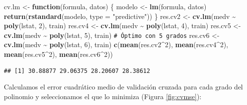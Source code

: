 \documentclass[
]{book}
\newenvironment{Shaded}{\begin{snugshade}}{\end{snugshade}}
\newcommand{\AttributeTok}[1]{\textcolor[rgb]{0.13,0.29,0.53}{#1}}
\newcommand{\CommentTok}[1]{\textcolor[rgb]{0.56,0.35,0.01}{\textit{#1}}}
\newcommand{\ControlFlowTok}[1]{\textcolor[rgb]{0.13,0.29,0.53}{\textbf{#1}}}
\newcommand{\DecValTok}[1]{\textcolor[rgb]{0.00,0.00,0.81}{#1}}
\newcommand{\FunctionTok}[1]{\textcolor[rgb]{0.13,0.29,0.53}{\textbf{#1}}}
\newcommand{\NormalTok}[1]{#1}
\newcommand{\OtherTok}[1]{\textcolor[rgb]{0.56,0.35,0.01}{#1}}
\newcommand{\SpecialCharTok}[1]{\textcolor[rgb]{0.81,0.36,0.00}{\textbf{#1}}}
\newcommand{\StringTok}[1]{\textcolor[rgb]{0.31,0.60,0.02}{#1}}
\theoremstyle{break}
\theoremstyle{nonumberplain}
\renewcommand{\CommentTok}[1]{\textcolor[rgb]{0.41,0.41,0.41}{\texttt{#1}}}
\begin{document}
\begin{Shaded}
\begin{Highlighting}[]
\NormalTok{cv.lm }\OtherTok{\textless{}{-}} \ControlFlowTok{function}\NormalTok{(formula, datos) \{}
\NormalTok{    modelo }\OtherTok{\textless{}{-}} \FunctionTok{lm}\NormalTok{(formula, datos)}
    \FunctionTok{return}\NormalTok{(}\FunctionTok{rstandard}\NormalTok{(modelo, }\AttributeTok{type =} \StringTok{"predictive"}\NormalTok{))}
\NormalTok{\}}
\NormalTok{res.cv2 }\OtherTok{\textless{}{-}} \FunctionTok{cv.lm}\NormalTok{(medv }\SpecialCharTok{\textasciitilde{}} \FunctionTok{poly}\NormalTok{(lstat, }\DecValTok{2}\NormalTok{), train)}
\NormalTok{res.cv4 }\OtherTok{\textless{}{-}} \FunctionTok{cv.lm}\NormalTok{(medv }\SpecialCharTok{\textasciitilde{}} \FunctionTok{poly}\NormalTok{(lstat, }\DecValTok{4}\NormalTok{), train)}
\NormalTok{res.cv5 }\OtherTok{\textless{}{-}} \FunctionTok{cv.lm}\NormalTok{(medv }\SpecialCharTok{\textasciitilde{}} \FunctionTok{poly}\NormalTok{(lstat, }\DecValTok{5}\NormalTok{), train) }\CommentTok{\# Óptimo con 5 grados}
\NormalTok{res.cv6 }\OtherTok{\textless{}{-}} \FunctionTok{cv.lm}\NormalTok{(medv }\SpecialCharTok{\textasciitilde{}} \FunctionTok{poly}\NormalTok{(lstat, }\DecValTok{6}\NormalTok{), train)}
\FunctionTok{c}\NormalTok{(}\FunctionTok{mean}\NormalTok{(res.cv2}\SpecialCharTok{\^{}}\DecValTok{2}\NormalTok{), }\FunctionTok{mean}\NormalTok{(res.cv4}\SpecialCharTok{\^{}}\DecValTok{2}\NormalTok{), }\FunctionTok{mean}\NormalTok{(res.cv5}\SpecialCharTok{\^{}}\DecValTok{2}\NormalTok{), }\FunctionTok{mean}\NormalTok{(res.cv6}\SpecialCharTok{\^{}}\DecValTok{2}\NormalTok{))}
\end{Highlighting}
\end{Shaded}

\begin{verbatim}
## [1] 30.88877 29.06375 28.20607 28.38612
\end{verbatim}

Calculamos el error cuadrático medio de validación cruzada para cada grado del polinomio y seleccionamos el que lo minimiza (Figura \ref{fig:cvmse}):
\end{document}
